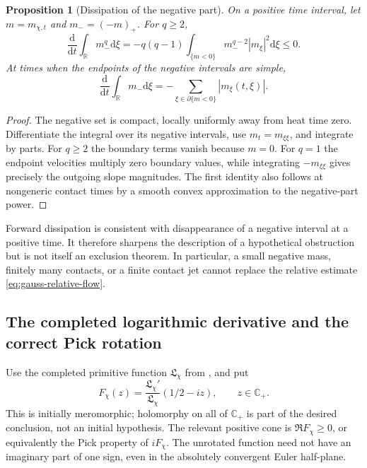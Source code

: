\documentclass[11pt]{article}
\newtheorem{proposition}[theorem]{Proposition}
\theoremstyle{definition}
\theoremstyle{remark}
\newcommand{\R}{\mathbb R}
\newcommand{\C}{\mathbb C}
\newcommand{\dd}{\mathrm d}
\begin{document}
\begin{proposition}[Dissipation of the negative part]
\label{prop:gauss-negative-entropy}
On a positive time interval, let $m=m_{\chi,t}$ and
$m_-=( -m)_+$.  For $q\ge2$,
\begin{equation}
 \frac{\dd}{\dd t}\int_\R m_-^q\dd\xi
 =-q(q-1)\int_{\{m<0\}}m_-^{q-2}|m_\xi|^2\dd\xi\le0.
 \label{eq:gauss-negative-entropy}
\end{equation}
At times when the endpoints of the negative intervals are simple,
\begin{equation}
 \frac{\dd}{\dd t}\int_\R m_-\dd\xi
 =-\sum_{\xi\in\partial\{m<0\}}|m_\xi(t,\xi)|.
 \label{eq:gauss-negative-flux}
\end{equation}
\end{proposition}

\begin{proof}
The negative set is compact, locally uniformly away from heat time
zero.  Differentiate the integral over its negative intervals, use
$m_t=m_{\xi\xi}$, and integrate by parts.  For $q\ge2$ the boundary
terms vanish because $m=0$.  For $q=1$ the endpoint velocities multiply
zero boundary values, while integrating $-m_{\xi\xi}$ gives precisely
the outgoing slope magnitudes.  The first identity also follows at
nongeneric contact times by a smooth convex approximation to the
negative-part power.
\end{proof}

Forward dissipation is consistent with disappearance of a negative
interval at a positive time.  It therefore sharpens the description of
a hypothetical obstruction but is not itself an exclusion theorem.
In particular, a small negative mass, finitely many contacts, or a
finite contact jet cannot replace the relative estimate
\eqref{eq:gauss-relative-flow}.

\subsection{The completed logarithmic derivative and the correct Pick rotation}
\label{subsec:pick-completed}

Use the completed primitive function $\mathfrak L_\chi$ from
, and put
\begin{equation}
 F_\chi(z)=\frac{\mathfrak L_\chi'}{\mathfrak L_\chi}
                         (1/2-iz),\qquad z\in\C_+.
 \label{eq:pick-completed}
\end{equation}
This is initially meromorphic; holomorphy on all of $\C_+$ is part of
the desired conclusion, not an initial hypothesis.  The relevant
positive cone is $\Re F_\chi\ge0$, or equivalently the Pick property
of $iF_\chi$.  The unrotated function need not have an imaginary part
of one sign, even in the absolutely convergent Euler half-plane.
\end{document}
